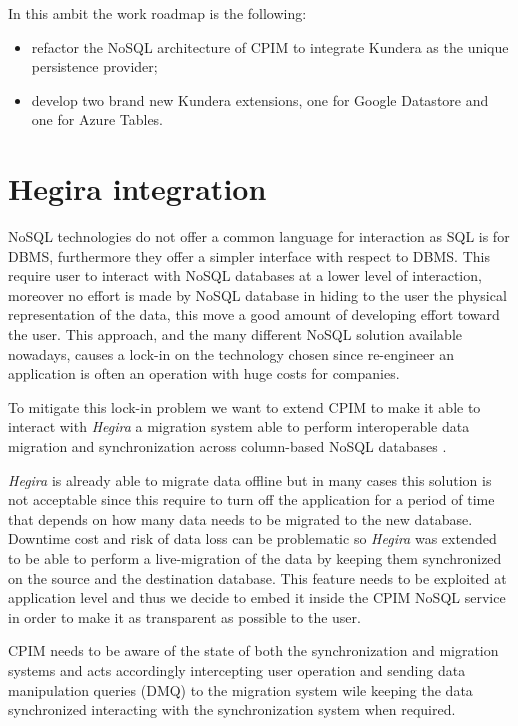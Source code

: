 \newparagraph In this ambit the work roadmap is the following:
\begin{itemize}
\item refactor the NoSQL architecture of CPIM to integrate Kundera as the unique persistence provider;
\item develop two brand new Kundera extensions, one for Google Datastore and one for Azure Tables.
\end{itemize}

\section{Hegira integration}
NoSQL technologies do not offer a common language for interaction as SQL is for DBMS, furthermore they offer a simpler interface with respect to DBMS. This require user to interact with NoSQL databases at a lower level of interaction, moreover no effort is made by NoSQL database in hiding to the user the physical representation of the data, this move a good amount of developing effort toward the user.
This approach, and the many different NoSQL solution available nowadays, causes a lock-in on the technology chosen since re-engineer an application is often an operation with huge costs for companies.

\newparagraph To mitigate this lock-in problem we want to extend CPIM to make it able to interact with \textit{Hegira} a migration system able to perform interoperable data migration and synchronization across column-based NoSQL databases \cite{paper:modaclouds-deliverable}.

\noindent \textit{Hegira} is already able to migrate data offline but in many cases this solution is not acceptable since this require to turn off the application for a period of time that depends on how many data needs to be migrated to the new database. 
Downtime cost and risk of data loss can be problematic so \textit{Hegira} was extended to be able to perform a live-migration of the data by keeping them synchronized on the source and the destination database.
This feature needs to be exploited at application level and thus we decide to embed it inside the CPIM NoSQL service in order to make it as transparent as possible to the user.

\noindent CPIM needs to be aware of the state of both the synchronization and migration systems and acts accordingly intercepting user operation and sending data manipulation queries (DMQ) to the migration system wile keeping the data synchronized interacting with the synchronization system when required.